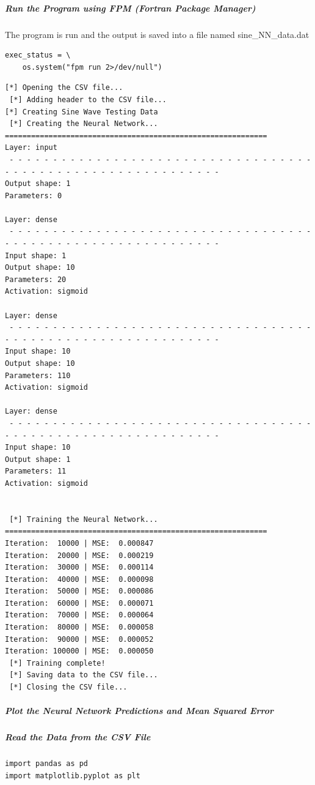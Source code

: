 \subparagraph{Run the Program using FPM (Fortran Package Manager)}

The program is run and the output is saved into a file named sine\_NN\_data.dat

\begin{verbatim}
exec_status = \
    os.system("fpm run 2>/dev/null")
\end{verbatim}

\begin{verbatim}
[*] Opening the CSV file...
 [*] Adding header to the CSV file...
[*] Creating Sine Wave Testing Data
 [*] Creating the Neural Network...
============================================================
Layer: input
 - - - - - - - - - - - - - - - - - - - - - - - - - - - - - - - - - - - - - - - - - - - - - - - - - - - - - - - - - - - -
Output shape: 1
Parameters: 0

Layer: dense
 - - - - - - - - - - - - - - - - - - - - - - - - - - - - - - - - - - - - - - - - - - - - - - - - - - - - - - - - - - - -
Input shape: 1
Output shape: 10
Parameters: 20
Activation: sigmoid

Layer: dense
 - - - - - - - - - - - - - - - - - - - - - - - - - - - - - - - - - - - - - - - - - - - - - - - - - - - - - - - - - - - -
Input shape: 10
Output shape: 10
Parameters: 110
Activation: sigmoid

Layer: dense
 - - - - - - - - - - - - - - - - - - - - - - - - - - - - - - - - - - - - - - - - - - - - - - - - - - - - - - - - - - - -
Input shape: 10
Output shape: 1
Parameters: 11
Activation: sigmoid


 [*] Training the Neural Network...
============================================================
Iteration:  10000 | MSE:  0.000847
Iteration:  20000 | MSE:  0.000219
Iteration:  30000 | MSE:  0.000114
Iteration:  40000 | MSE:  0.000098
Iteration:  50000 | MSE:  0.000086
Iteration:  60000 | MSE:  0.000071
Iteration:  70000 | MSE:  0.000064
Iteration:  80000 | MSE:  0.000058
Iteration:  90000 | MSE:  0.000052
Iteration: 100000 | MSE:  0.000050
 [*] Training complete!
 [*] Saving data to the CSV file...
 [*] Closing the CSV file...
\end{verbatim}

\subparagraph{Plot the Neural Network Predictions and Mean Squared Error}

\subparagraph{Read the Data from the CSV File}

\begin{verbatim}
import pandas as pd
import matplotlib.pyplot as plt
\end{verbatim}

